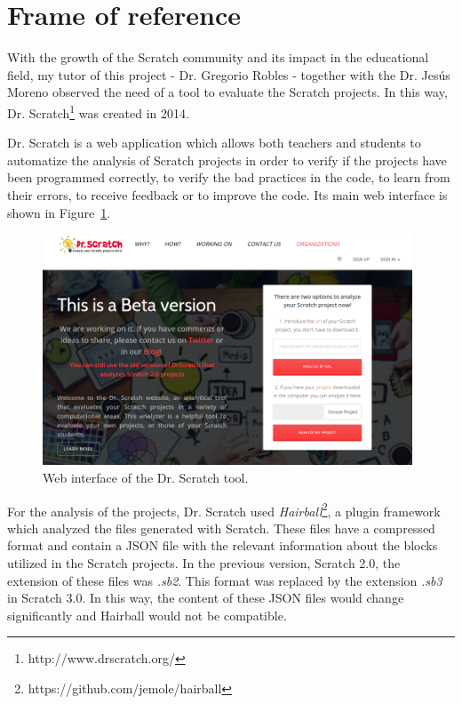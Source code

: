 \section{Frame of reference}
\label{sec:reference}

With the growth of the Scratch community and its impact in the educational field, my tutor of this project - Dr. Gregorio Robles - together with the Dr. Jesús Moreno observed the need of a tool to evaluate the Scratch projects. In this way, Dr. Scratch\footnote{http://www.drscratch.org/} was created in 2014.

Dr. Scratch is a web application which allows both teachers and students to automatize the analysis of Scratch projects in order to verify if the projects have been programmed correctly, to verify the bad practices in the code, to learn from their errors, to receive feedback or to improve the code. Its main web interface is shown in Figure~\ref{fig:dr_scratch}.

\begin{figure}
  \centering
  \includegraphics[width=11cm, keepaspectratio]{img/dr_scratch.png}
  \caption{Web interface of the Dr. Scratch tool.}
  \label{fig:dr_scratch}
\end{figure}

For the analysis of the projects, Dr. Scratch used \textit{Hairball}\footnote{https://github.com/jemole/hairball}, a plugin framework which analyzed the files generated with Scratch. These files have a compressed format and contain a JSON file with the relevant information about the blocks utilized in the Scratch projects. In the previous version, Scratch 2.0, the extension of these files was \textit{.sb2}. This format was replaced by the extension \textit{.sb3} in Scratch 3.0. In this way, the content of these JSON files would change significantly and Hairball would not be compatible.


